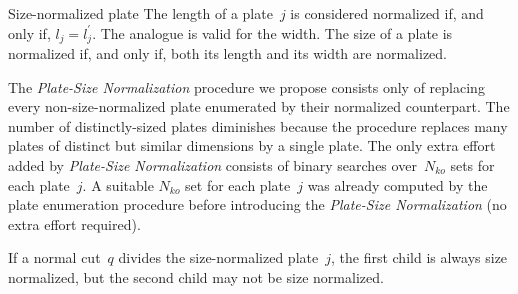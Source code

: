 \documentclass[ppgc,prop-tese,english,formais,babel]{iiufrgs}
\begin{document}
\begin{definition}{Size-normalized plate}
The length of a plate~\(j\) is considered normalized if, and only if, \(l_j = l^\prime_j\).
The analogue is valid for the width.
The size of a plate is normalized if, and only if, both its length and its width are normalized.
\end{definition}

The \emph{Plate-Size Normalization} procedure we propose consists only of replacing every non-size-normalized plate enumerated by their normalized counterpart.
The number of distinctly-sized plates diminishes because the procedure replaces many plates of distinct but similar dimensions by a single plate.
The only extra effort added by \emph{Plate-Size Normalization} consists of binary searches over~\(N_{ko}\) sets for each plate~\(j\).
A suitable \(N_{ko}\) set for each plate~\(j\) was already computed by the plate enumeration procedure before introducing the \emph{Plate-Size Normalization} (no extra effort required).

\begin{remark}
If a normal cut~\(q\) divides the size-normalized plate~\(j\), the first child is always size normalized, but the second child may not be size normalized.
\end{remark}


% 
% 



\end{document}
